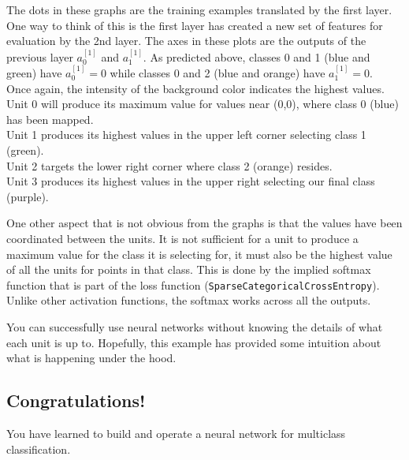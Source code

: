 \documentclass[11pt]{article}
\makeatletter
\newcommand{\boxspacing}{\kern\kvtcb@left@rule\kern\kvtcb@boxsep}
\newcommand{\prompt}[4]{
        \ttfamily\llap{{\color{#2}[#3]:\hspace{3pt}#4}}\vspace{-\baselineskip}
    }
\makeatother
\begin{document}
The dots in these graphs are the training examples translated by the
first layer. One way to think of this is the first layer has created a
new set of features for evaluation by the 2nd layer. The axes in these
plots are the outputs of the previous layer \(a^{[1]}_0\) and
\(a^{[1]}_1\). As predicted above, classes 0 and 1 (blue and green) have
\(a^{[1]}_0 = 0\) while classes 0 and 2 (blue and orange) have
\(a^{[1]}_1 = 0\).\\
Once again, the intensity of the background color indicates the highest
values.\\
Unit 0 will produce its maximum value for values near (0,0), where class
0 (blue) has been mapped.\\
Unit 1 produces its highest values in the upper left corner selecting
class 1 (green).\\
Unit 2 targets the lower right corner where class 2 (orange) resides.\\
Unit 3 produces its highest values in the upper right selecting our
final class (purple).

One other aspect that is not obvious from the graphs is that the values
have been coordinated between the units. It is not sufficient for a unit
to produce a maximum value for the class it is selecting for, it must
also be the highest value of all the units for points in that class.
This is done by the implied softmax function that is part of the loss
function (\texttt{SparseCategoricalCrossEntropy}). Unlike other
activation functions, the softmax works across all the outputs.

You can successfully use neural networks without knowing the details of
what each unit is up to. Hopefully, this example has provided some
intuition about what is happening under the hood.

    \hypertarget{congratulations}{%
\subsection{Congratulations!}\label{congratulations}}

You have learned to build and operate a neural network for multiclass
classification.

    \begin{tcolorbox}[breakable, size=fbox, boxrule=1pt, pad at break*=1mm,colback=cellbackground, colframe=cellborder]
\prompt{In}{incolor}{ }{\boxspacing}
\begin{Verbatim}[commandchars=\\\{\}]

\end{Verbatim}
\end{tcolorbox}


    
    
    
\end{document}
